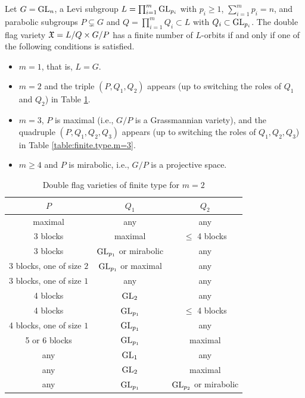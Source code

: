 \documentclass[12pt,reqno]{amsart}
\begin{document}
\begin{theorem}\label{T:main_theorem}
Let $G=\mathrm{GL}_n$, a Levi subgroup $L=\prod_{i=1}^m \mathrm{GL}_{p_i}$ with $p_i\geq 1$, $\sum_{i=1}^m p_i=n$, and parabolic subgroups
$P\subsetneq G$ and $Q=\prod_{i=1}^m Q_i\subset L$ with $Q_i\subset \mathrm{GL}_{p_i}$.
The double flag variety $\mathfrak{X}=L/Q\times G/P$ has a finite number of $L$-orbits if and only if one of the following conditions is satisfied.
%
\begin{itemize}
\item[\rm (A)] $m=1$, that is, $L=G$.
\item[\rm (B)] $m=2$ and the triple $(P,Q_1,Q_2)$ appears (up to switching the roles of $Q_1$ and $Q_2$) in Table \ref{table:finite.type.m=2}.
\item[\rm (C)] $m=3$, $P$ is maximal (i.e., $G/P$ is a Grassmannian variety), and the quadruple $(P,Q_1,Q_2,Q_3)$ appears (up to switching the roles of $Q_1,Q_2,Q_3$) in Table \ref{table:finite.type.m=3}.
\item[\rm (D)] $m\geq 4$ and $P$ is mirabolic, i.e., $G/P$ is a projective space.
\end{itemize}
\end{theorem}

\begin{table}[htbp]
%
\caption{Double flag varieties of finite type for $m=2$}\label{table:finite.type.m=2}
%
\begin{tabular}{||c|c|c||}
\hline
$P$ & $Q_1$  &  $Q_2$ \\ \hline \hline
maximal & any & any \\ \hline
3 blocks & maximal & $\leq$ 4 blocks \\ \hline
3 blocks & $\mathrm{GL}_{p_1}$ or mirabolic & any \\ \hline
3 blocks, one of size $2$ & $\mathrm{GL}_{p_1}$ or maximal  & any \\ \hline
3 blocks, one of size $1$ & any & any \\ \hline
4 blocks & $\mathrm{GL}_2$ & any \\ \hline
4 blocks & $\mathrm{GL}_{p_1}$ & $\leq$ 4 blocks \\ \hline
4 blocks, one of size $1$ & $\mathrm{GL}_{p_1}$ & any \\ \hline
5 or 6 blocks & $\mathrm{GL}_{p_1}$ & maximal \\ \hline
any & $\mathrm{GL}_1$ & any \\ \hline
any & $\mathrm{GL}_2$ & maximal \\ \hline
any & $\mathrm{GL}_{p_1}$ & $\mathrm{GL}_{p_2}$ or mirabolic \\ \hline
\end{tabular}
\hfil
\end{table}
\end{document}
